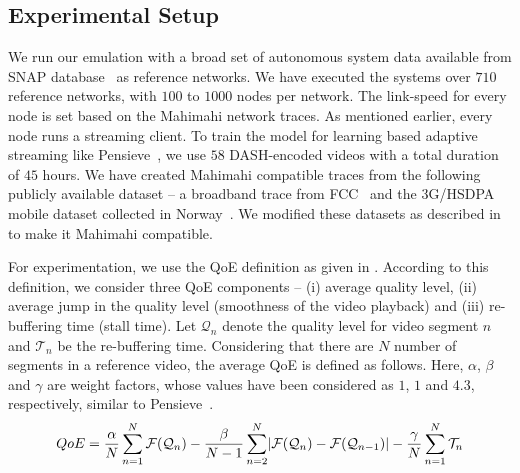 \subsection{Experimental Setup}
We run our emulation with a broad set of autonomous system data available from SNAP database~\cite{ASDataSet} as reference networks. We have executed the systems over $710$ reference networks, with $100$ to $1000$ nodes per network. The link-speed for every node is set based on the Mahimahi network traces. As mentioned earlier, every node runs a streaming client. To train the model for learning based adaptive streaming like Pensieve~\cite{mao2017neural}, we use $58$ DASH-encoded videos with a total duration of $45$ hours.
We have created Mahimahi compatible traces from the following publicly available dataset -- a broadband trace from FCC~\cite{dataset-fcc} and the 3G/HSDPA mobile dataset collected in Norway~\cite{dataset-norway}. We modified these datasets as described in \cite{mao2017neural} to make it Mahimahi compatible.

For experimentation, we use the QoE definition as given in \cite{mao2017neural}. According to this definition, we consider three QoE components -- (i) average quality level, (ii) average jump in the quality level (smoothness of the video playback) and (iii) re-buffering time (stall time). Let $\mathcal{Q}_n$ denote the quality level for video segment $n$ and $\mathcal{T}_n$ be the re-buffering time. Considering that there are $N$ number of segments in a reference video, the average QoE is defined as follows. Here, $\alpha$, $\beta$ and $\gamma$ are weight factors, whose values have been considered as $1$, $1$ and $4.3$, respectively, similar to Pensieve~\cite{mao2017neural}.
\begin{equation}
\scriptsize
QoE = \frac{\alpha}{N}\sum_{n=1}^{N} \mathcal{F}(\mathcal{Q}_n) - \frac{\beta}{N-1} \sum_{n=2}^{N}\lvert\mathcal{F}(\mathcal{Q}_n) -\mathcal{F}(\mathcal{Q}_{n-1})\rvert - \frac{\gamma}{N}\sum_{n=1}^{N}\mathcal{T}_n
\label{eqn:chap06:QoE}
\end{equation}
